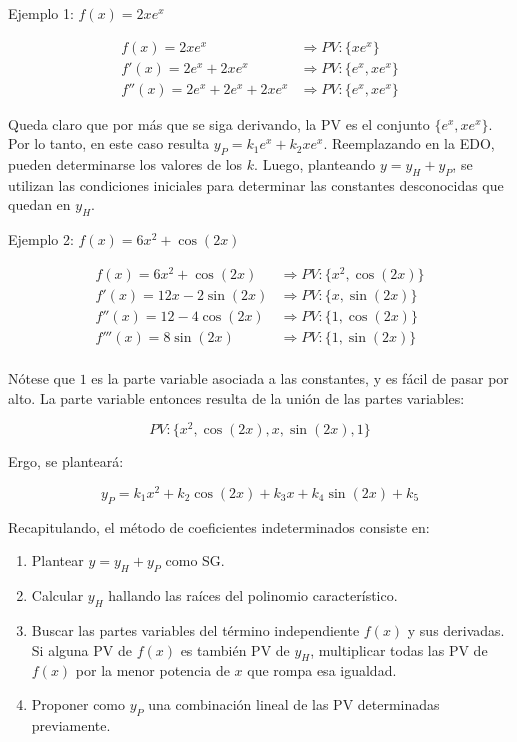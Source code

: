 \documentclass{article}
\begin{document}
Ejemplo 1: $f(x) = 2 x e^x$

\begin{equation}
\begin{array}{ll}
f(x) = 2 x e^x &\Rightarrow PV: \{x e^x\} \\
f'(x) = 2 e^x + 2 x e^x &\Rightarrow PV: \{e^x, x e^x\} \\
f''(x) = 2 e^x + 2 e^x + 2 x e^x &\Rightarrow PV: \{e^x, x e^x\}
\end{array}
\end{equation}

Queda claro que por más que se siga derivando, la PV es el conjunto $\{e^x, x e^x\}$. Por lo tanto, en este caso resulta $y_P = k_1 e^x + k_2 x e^x$. Reemplazando en la EDO, pueden determinarse los valores de los $k$. Luego, planteando $y = y_H + y_P$, se utilizan las condiciones iniciales para determinar las constantes desconocidas que quedan en $y_H$.

Ejemplo 2: $f(x) = 6 x^2 + \cos (2x)$

\begin{equation}
\begin{array}{ll}
f(x) = 6 x^2 + \cos(2 x) &\Rightarrow PV: \{x^2, \cos(2 x)\} \\
f'(x) = 12 x - 2 \sin(2 x) &\Rightarrow PV: \{x, \sin(2 x)\} \\
f''(x) = 12 - 4 \cos(2 x) &\Rightarrow PV: \{1, \cos(2 x)\} \\
f'''(x) = 8 \sin(2 x) &\Rightarrow PV: \{1, \sin(2 x)\} \\
\end{array}
\end{equation}

Nótese que $1$ es la parte variable asociada a las constantes, y es fácil de pasar por alto. La parte variable entonces resulta de la unión de las partes variables:

\begin{equation}
PV: \{x^2, \cos(2 x), x, \sin(2 x), 1\}
\end{equation}

Ergo, se planteará:

\begin{equation}
y_P = k_1 x^2 + k_2 \cos(2x) + k_3 x + k_4 \sin(2 x) + k_5
\end{equation}

Recapitulando, el método de coeficientes indeterminados consiste en:

\begin{enumerate}
\item Plantear $y = y_H + y_P$ como SG.
\item Calcular $y_H$ hallando las raíces del polinomio característico.
\item Buscar las partes variables del término independiente $f(x)$ y sus derivadas. Si alguna PV de $f(x)$ es también PV de $y_H$, multiplicar todas las PV de $f(x)$ por la menor potencia de $x$ que rompa esa igualdad.
\item Proponer como $y_P$ una combinación lineal de las PV determinadas previamente.
\end{enumerate}
\end{document}
